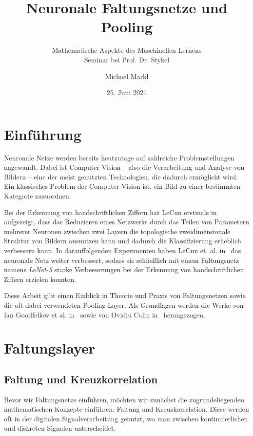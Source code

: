 \documentclass[paper=a4, 	%
		fontsize=11pt,
		abstract=true, 	%
		headsepline, 	%
		notitlepage	%
		]{scrartcl}
\title{Neuronale Faltungsnetze und Pooling}
\author{Michael Markl}
\date{25. Juni 2021}
\subtitle{Mathematische Aspekte des Maschinellen Lernens\\ Seminar bei Prof. Dr. Stykel}
\theoremstyle{definition}
\begin{document}
\maketitle


\section{Einführung}

Neuronale Netze werden bereits heutzutage auf zahlreiche Problemstellungen angewandt.
Dabei ist Computer Vision -- also die Verarbeitung und Analyse von Bildern -- eine der meist genutzten Technologien, die dadurch ermöglicht wird.
Ein klassisches Problem der Computer Vision ist, ein Bild zu einer bestimmten Kategorie zuzuordnen.



Bei der Erkennung von handschriftlichen Ziffern hat LeCun erstmals in~\cite{LeCun1989} aufgezeigt, dass das Reduzieren eines Netzwerks durch das Teilen von Parametern mehrerer Neuronen zwischen zwei Layern die topologische zweidimensionale Struktur von Bildern ausnutzen kann und dadurch die Klassifizierung erheblich verbessern kann.
In darauffolgenden Experimenten haben LeCun et. al. in~\cite{lecun1998} das neuronale Netz weiter verbessert, sodass sie schließlich mit einem Faltungsnetz namens \emph{LeNet-5} starke Verbesserungen bei der Erkennung von handschriftlichen Ziffern erzielen konnten.

Diese Arbeit gibt einen Einblick in Theorie und Praxis von Faltungsnetzen sowie die oft dabei verwendeten Pooling-Layer.
Als Grundlagen werden die Werke von Ian Goodfellow et al. in~\cite[Kapitel~9]{Goodfellow-et-al-2016} sowie von Ovidiu Calin in~\cite[Kapitel~15,16]{Calin2020} herangezogen.

\section{Faltungslayer}

\subsection{Faltung und Kreuzkorrelation}\label{subsec:convolution}

Bevor wir Faltungsnetze einführen, möchten wir zunächst die zugrundeliegenden mathematischen Konzepte einführen:
Faltung und Kreuzkorrelation.
Diese werden oft in der digitalen Signalverarbeitung genutzt, wo man zwischen kontinuierlichen und diskreten Signalen unterscheidet.
\end{document}

